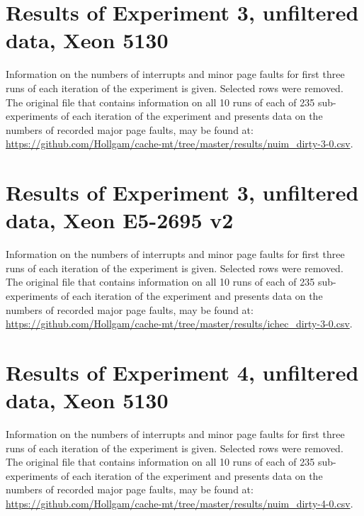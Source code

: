 \begin{appendices}

\chapter{Results of Experiment 3, unfiltered data, Xeon 5130}
\label{app:app-level-results-3-nuim}

Information on the numbers of interrupts and minor page faults for first three runs of each iteration of the experiment is given. Selected rows were removed. The original file that contains information on all 10 runs of each of 235 sub-experiments of each iteration of the experiment and presents data on the numbers of recorded major page faults, may be found at: \url{https://github.com/Hollgam/cache-mt/tree/master/results/nuim\_dirty-3-0.csv}.


\chapter{Results of Experiment 3, unfiltered data, Xeon E5-2695 v2}
\label{app:app-level-results-3-ichec}

Information on the numbers of interrupts and minor page faults for first three runs of each iteration of the experiment is given. Selected rows were removed. The original file that contains information on all 10 runs of each of 235 sub-experiments of each iteration of the experiment and presents data on the numbers of recorded major page faults, may be found at: \url{https://github.com/Hollgam/cache-mt/tree/master/results/ichec\_dirty-3-0.csv}.


\chapter{Results of Experiment 4, unfiltered data, Xeon 5130}
\label{app:app-level-results-4-nuim}

Information on the numbers of interrupts and minor page faults for first three runs of each iteration of the experiment is given. Selected rows were removed. The original file that contains information on all 10 runs of each of 235 sub-experiments of each iteration of the experiment and presents data on the numbers of recorded major page faults, may be found at: \url{https://github.com/Hollgam/cache-mt/tree/master/results/nuim\_dirty-4-0.csv}.


\end{appendices}
